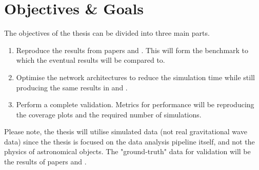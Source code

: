 \section{Objectives \& Goals}
\label{sec:objectives_and_goals}

The objectives of the thesis can be divided into three main parts.
\begin{enumerate}
\item Reproduce the results from papers \cite{bhardwaj2023peregrine} and \cite{alvey2023things}. This will form the benchmark to which the eventual results will be compared to.
\item Optimise the network architectures to reduce the simulation time while still producing the same results in \cite{bhardwaj2023peregrine} and \cite{alvey2023things}.
\item Perform a complete validation. Metrics for performance will be reproducing the coverage plots \cite{bhardwaj2023peregrine} and the required number of simulations.
\end{enumerate}

Please note, the thesis will utilise simulated data (not real gravitational wave data) since the thesis is focused on the data analysis pipeline itself, and not the physics of astronomical objects. The "ground-truth" data for validation will be the results of papers \cite{bhardwaj2023peregrine} and \cite{alvey2023things}.
